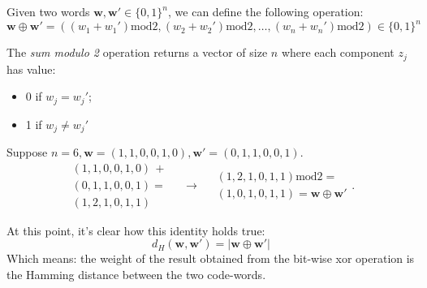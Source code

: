\begin{definition}
Given two words $\textbf{w}, \textbf{w}' \in \{0,1\}^n$, we can define the following operation:
\begin{equation}
    \textbf{w} \oplus \textbf{w}' = ((w_1 + w_1')\text{mod}2, (w_2 + w_2')\text{mod}2, \ldots, (w_n + w_n')\text{mod}2) \in \{0,1\}^n
\end{equation}
\end{definition}
The \emph{sum modulo 2} operation returns a vector of size $n$ where each component  $z_j$ has value:
\begin{itemize}
    \item 0 if $w_j = w_j'$;
    \item 1 if $w_j \neq w_j'$
\end{itemize}

\begin{example}
Suppose $n=6, \textbf{w} = (1, 1, 0, 0, 1, 0), \textbf{w}' = (0, 1, 1, 0, 0, 1)$.
\begin{equation}
\begin{array}{l}
(1, 1, 0, 0, 1, 0) \,+ \\
(0, 1, 1, 0, 0, 1) = \\  \hline
(1, 2, 1, 0, 1, 1)
\end{array}
\quad\rightarrow\quad
\begin{array}{l}
(1, 2, 1, 0, 1, 1)\text{mod} 2 = \\ \hline
(1, 0, 1, 0, 1, 1) = \textbf{w} \oplus \textbf{w}'
\end{array}.
\end{equation}
\end{example}

At this point, it's clear how this identity holds true:
\begin{equation}
    d_H(\textbf{w}, \textbf{w}') = |\textbf{w} \oplus \textbf{w}'|
\end{equation}
Which means: the weight of the result obtained from the bit-wise xor operation is the Hamming distance between the two code-words.

